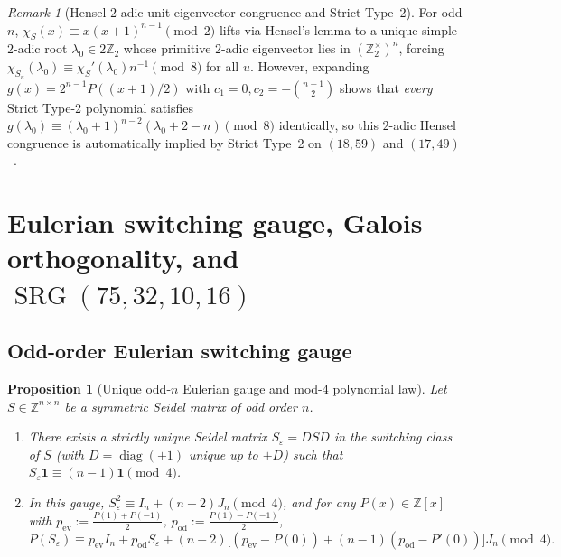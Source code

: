 \documentclass[11pt,reqno]{amsart}
\newtheorem{proposition}[theorem]{Proposition}
\theoremstyle{definition}
\theoremstyle{remark}
\newtheorem{remark}[theorem]{Remark}
\DeclareMathOperator{\SRG}{SRG}
\DeclareMathOperator{\diag}{diag}
\begin{document}
\begin{remark}[Hensel $2$-adic unit-eigenvector congruence and Strict Type~2]\label{rem:weaponb}
For odd $n$, $\chi_S(x) \equiv x(x+1)^{n-1} \pmod 2$ lifts via Hensel's lemma to a unique simple $2$-adic root $\lambda_0 \in 2\mathbb{Z}_2$ whose primitive $2$-adic eigenvector lies in $(\mathbb{Z}_2^\times)^n$, forcing $\chi_{S_u}(\lambda_0) \equiv \chi_S'(\lambda_0) n^{-1} \pmod 8$ for all $u$. However, expanding $g(x) = 2^{n-1} P((x+1)/2)$ with $c_1 = 0, c_2 = -\binom{n-1}{2}$ shows that \emph{every} Strict Type-2 polynomial satisfies $g(\lambda_0) \equiv (\lambda_0+1)^{n-2}(\lambda_0+2-n) \pmod 8$ identically, so this $2$-adic Hensel congruence is automatically implied by Strict Type~2 on $(18, 59)$ and $(17, 49)$~\cite{CompanionFull}.
\end{remark}

\section{Eulerian switching gauge, Galois orthogonality, and \texorpdfstring{$\SRG(75,32,10,16)$}{SRG(75,32,10,16)}}\label{sec:galois_srg}

\subsection{Odd-order Eulerian switching gauge}
\begin{proposition}[Unique odd-$n$ Eulerian gauge and mod-$4$ polynomial law]\label{prop:eulerian}
Let $S \in \mathbb{Z}^{n \times n}$ be a symmetric Seidel matrix of \emph{odd} order $n$.
\begin{enumerate}
  \item There exists a strictly unique Seidel matrix $S_\varepsilon = D S D$ in the switching class of $S$ (with $D = \diag(\pm 1)$ unique up to $\pm D$) such that $S_\varepsilon \mathbf{1} \equiv (n - 1)\mathbf{1} \pmod 4$.
  \item In this gauge, $S_\varepsilon^2 \equiv I_n + (n - 2)J_n \pmod 4$, and for any $P(x) \in \mathbb{Z}[x]$ with $p_{\mathrm{ev}} := \frac{P(1)+P(-1)}{2}$, $p_{\mathrm{od}} := \frac{P(1)-P(-1)}{2}$,
  \[
    P(S_\varepsilon) \equiv p_{\mathrm{ev}} I_n + p_{\mathrm{od}} S_\varepsilon + (n - 2)\big[(p_{\mathrm{ev}} - P(0)) + (n - 1)(p_{\mathrm{od}} - P'(0))\big] J_n \pmod{4}.
  \]
\end{enumerate}
\end{proposition}
\end{document}
